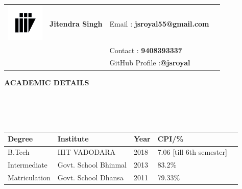\documentclass[a4paper,10pt]{article}
\newcommand{\lsep}{-0.5cm}
\newcommand{\resheading}[1]{{\small \colorbox{mygrey}{\begin{minipage}{0.975\textwidth}{\textbf{#1 \vphantom{p\^{E}}}}\end{minipage}}}}
\begin{document}
\indent \begin{tabular}{ l @{\hskip 0.9in} l @{\hskip 0.9in} l @{\hskip 0.8in} l}

\includegraphics[width=1.8cm]{logo.png} & \textbf{\fontsize{25}{60}\selectfont Jitendra Singh} &
 Email : \textbf{jsroyal55@gmail.com}\\ & &
 Contact : \textbf{9408393337}\\ & &
 GitHub Profile :\textbf{@jsroyal}\\


\end{tabular}



\resheading{\textbf{ACADEMIC DETAILS} }\\[\lsep]
\\ \\
\indent \begin{tabular}{ l @{\hskip 0.55in} l @{\hskip 0.55in} l @{\hskip 0.6in} l @{\hskip 0.8in} l }

\textbf{Degree} & \textbf{Institute} & \textbf{Year} & \textbf{CPI/\%} \\\hline

B.Tech & IIIT VADODARA & 2018 & 7.06 [till 6th semester]      \\
Intermediate & Govt. School Bhinmal & 2013 & 83.2\% \\
Matriculation & Govt. School Dhansa & 2011 & 79.33\%\\


\end{tabular}
\\
\end{document}
